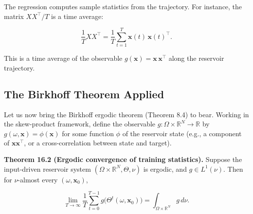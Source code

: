 The regression computes sample statistics from the trajectory. For instance, the matrix $X X^\top / T$ is a time average:

\[
\frac{1}{T} X X^\top = \frac{1}{T} \sum_{t=1}^{T} \mathbf{x}(t)\, \mathbf{x}(t)^\top.
\]

This is a time average of the observable $g(\mathbf{x}) = \mathbf{x}\, \mathbf{x}^\top$ along the reservoir trajectory.

\subsection{The Birkhoff Theorem Applied}\label{sec:16.2.2}

Let us now bring the Birkhoff ergodic theorem (Theorem 8.4) to bear. Working in the skew-product framework, define the observable $g: \Omega \times \mathbb{R}^N \to \mathbb{R}$ by $g(\omega, \mathbf{x}) = \phi(\mathbf{x})$ for some function $\phi$ of the reservoir state (e.g., a component of $\mathbf{x} \mathbf{x}^\top$, or a cross-correlation between state and target).

\textbf{Theorem 16.2 (Ergodic convergence of training statistics).} Suppose the input-driven reservoir system $(\Omega \times \mathbb{R}^N, \Theta, \nu)$ is ergodic, and $g \in L^1(\nu)$. Then for $\nu$-almost every $(\omega, \mathbf{x}_0)$,

\[
\lim_{T \to \infty} \frac{1}{T} \sum_{t=0}^{T-1} g\bigl(\Theta^t(\omega, \mathbf{x}_0)\bigr) = \int_{\Omega \times \mathbb{R}^N} g \, d\nu.
\]


